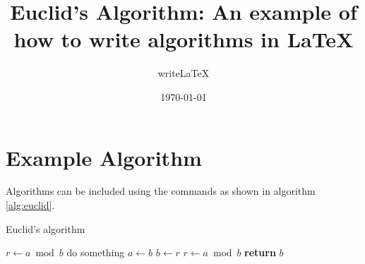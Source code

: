 \documentclass[a4paper]{article}
\title{Euclid's Algorithm: An example of how to write algorithms in \LaTeX{}}
\author{write\LaTeX{}}
\date{\today}
\begin{document}
	\maketitle
	
	\section{Example Algorithm}
	
	Algorithms can be included using the commands as shown in algorithm \ref{alg:euclid}.
	
	\begin{algorithm}
		\caption{Euclid’s algorithm}\label{alg:euclid}
		\begin{algorithmic}[1]
			\State $r\gets a\bmod b$
			\State do something
			\EndIf
			\State $a\gets b$
			\State $b\gets r$
			\State $r\gets a\bmod b$
			\EndWhile\label{euclidendwhile}
			\State \textbf{return} $b$
			\EndProcedure
		\end{algorithmic}
	\end{algorithm}
	
\end{document}
